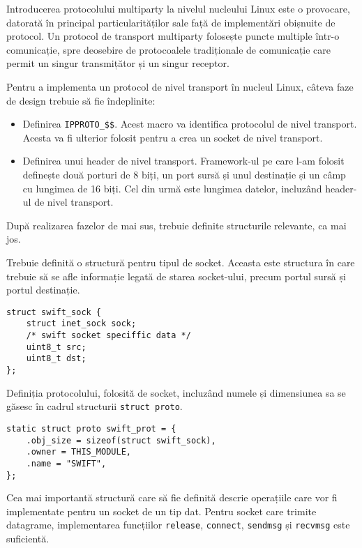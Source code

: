 Introducerea protocolului multiparty la nivelul nucleului Linux este o
provocare, datorată în principal particularităților sale față de implementări
obișnuite de protocol. Un protocol de transport multiparty folosește puncte
multiple într-o comunicație, spre deosebire de protocoalele tradiționale de
comunicație care permit un singur transmițător și un singur receptor.

Pentru a implementa un protocol de nivel transport în nucleul Linux, câteva
faze de design trebuie să fie îndeplinite:

\begin{itemize}
  \item Definirea \texttt{IPPROTO\_\$\$}. Acest macro va identifica protocolul
  de nivel transport. Acesta va fi ulterior folosit pentru a crea un socket de
  nivel transport.
  \item Definirea unui header de nivel transport. Framework-ul pe care l-am
  folosit definește două porturi de 8 biți, un port sursă și unul destinație
  și un câmp cu lungimea de 16 biți. Cel din urmă este lungimea datelor,
  incluzând header-ul de nivel transport.
\end{itemize}

După realizarea fazelor de mai sus, trebuie definite structurile relevante, ca
mai jos.

Trebuie definită o structură pentru tipul de socket. Aceasta este structura în
care trebuie să se afle informație legată de starea socket-ului, precum portul
sursă și portul destinație.

\begin{verbatim}
struct swift_sock {
    struct inet_sock sock;
    /* swift socket speciffic data */
    uint8_t src;
    uint8_t dst;
};
\end{verbatim}

Definiția protocolului, folosită de socket, incluzând numele și dimensiunea sa
se găsesc în cadrul structurii \texttt{struct proto}.

\begin{verbatim}
static struct proto swift_prot = {
    .obj_size = sizeof(struct swift_sock),
    .owner = THIS_MODULE,
    .name = "SWIFT",
};
\end{verbatim}

Cea mai importantă structură care să fie definită descrie operațiile care vor
fi implementate pentru un socket de un tip dat. Pentru socket care trimite
datagrame, implementarea funcțiilor \texttt{release}, \texttt{connect},
\texttt{sendmsg} și \texttt{recvmsg} este suficientă.

